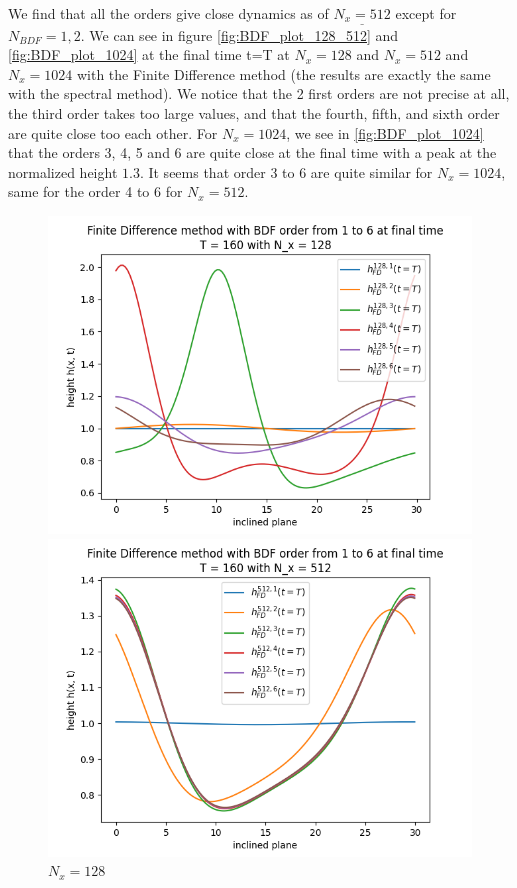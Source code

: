 \documentclass[12pt]{article}
\begin{document}
We find that all the orders give close dynamics as of $\underline{N_x=512}$ except for $N_{BDF}=1, 2$. 
We can see in figure \eqref{fig:BDF_plot_128_512}  and \eqref{fig:BDF_plot_1024} at the final time t=T at $N_x = 128$ and $N_x = 512$ and $N_x=1024$ with the Finite Difference method (the results are exactly the same with the spectral method). We notice that the 2 first orders are not precise at all, the third order takes too large values, and that the fourth, fifth, and sixth order are quite close too each other. For $N_x = 1024$, we see in \eqref{fig:BDF_plot_1024} that the orders 3, 4, 5 and 6 are quite close at the final time with a peak at the normalized height $1.3$. It seems that order 3 to 6 are quite similar for $N_x=1024$, same for the order 4 to 6 for $N_x=512.$


\begin{figure}[htbp]
    \centering
    \begin{minipage}[b]{0.45\textwidth}
        \centering
        \includegraphics[width=\textwidth]{Verif_scheme/plot_FD_BDF_Nx_128.png}
        \caption{$N_x = 128$}
        \label{fig:image1}
    \end{minipage}
    \hfill
    \begin{minipage}[b]{0.45\textwidth}
        \centering
        \includegraphics[width=\textwidth]{Verif_scheme/plot_FD_BDF_Nx_512.png}

\end{minipage}
\end{figure}
\end{document}
